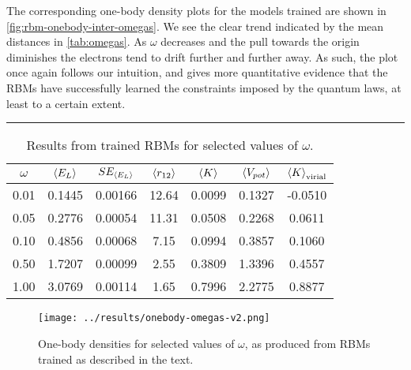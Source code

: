 \documentclass[a4paper, 11pt]{article}
\begin{document}
\begin{multicols}{2}
    The corresponding one-body density plots for the models trained are shown in
    \autoref{fig:rbm-onebody-inter-omegas}. We see the clear trend indicated
    by the mean distances in \autoref{tab:omegas}. As $\omega$ decreases and the
    pull towards the origin diminishes the electrons tend to drift further and
    further away. As such, the plot once again follows our intuition, and gives
    more quantitative evidence that the RBMs have successfully learned the
    constraints imposed by the quantum laws, at least to a certain extent.

\end{multicols}
\hrule
\setcounter{table}{2}
\begin{table}
        \centering
        \caption{Results from trained RBMs for selected values of $\omega$.}
        \label{tab:omegas}
        \vspace{0.5cm}
    \begin{tabular}{|c|c|c|c|c|c|c|}\hline
        $\omega$ & $\expval{E_L}$ & $SE_{\expval{E_L}}$ & $\expval{r_{12}}$ & $\expval{K}$ &
        $\expval{V_{pot}}$ & $\expval{K}_\text{virial}$ \\\hline

        0.01 & 0.1445 & 0.00166 & 12.64 & 0.0099 & 0.1327 & -0.0510\\
        0.05 & 0.2776 & 0.00054 & 11.31 & 0.0508 & 0.2268 &  0.0611\\
        0.10 & 0.4856 & 0.00068 &  7.15 & 0.0994 & 0.3857 &  0.1060\\
        0.50 & 1.7207 & 0.00099 &  2.55 & 0.3809 & 1.3396 &  0.4557\\
        1.00 & 3.0769 & 0.00114 &  1.65 & 0.7996 & 2.2775 &  0.8877\\\hline
    \end{tabular}
\end{table}
\begin{figure}[ht]
    \centering
    \texttt{[image: ../results/onebody-omegas-v2.png]}
    \caption{One-body densities for selected values of $\omega$, as produced
    from RBMs trained as described in the text.}
    \label{fig:rbm-onebody-inter-omegas}
\end{figure}
\end{document}
